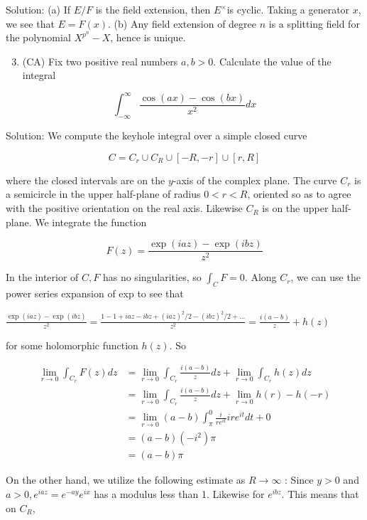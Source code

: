 \documentclass[10pt]{article}
\begin{document}
Solution: (a) If $E / F$ is the field extension, then $E^{\times}$is cyclic. Taking a generator $x$, we see that $E=F(x)$. (b) Any field extension of degree $n$ is a splitting field for the polynomial $X^{p^{n}}-X$, hence is unique.

\begin{enumerate}
  \setcounter{enumi}{2}
  \item (CA) Fix two positive real numbers $a, b>0$. Calculate the value of the integral
\end{enumerate}

$$
\int_{-\infty}^{\infty} \frac{\cos (a x)-\cos (b x)}{x^{2}} d x
$$

Solution: We compute the keyhole integral over a simple closed curve

$$
C=C_{r} \cup C_{R} \cup[-R,-r] \cup[r, R]
$$

where the closed intervals are on the $y$-axis of the complex plane. The curve $C_{r}$ is a semicircle in the upper half-plane of radius $0<r<R$, oriented so as to agree with the positive orientation on the real axis. Likewise $C_{R}$ is on the upper half-plane. We integrate the function

$$
F(z)=\frac{\exp (i a z)-\exp (i b z)}{z^{2}}
$$

In the interior of $C, F$ has no singularities, so $\int_{C} F=0$. Along $C_{r}$, we can use the power series expansion of exp to see that

$\frac{\exp (i a z)-\exp (i b z)}{z^{2}}=\frac{1-1+i a z-i b z+(i a z)^{2} / 2-(i b z)^{2} / 2+\ldots}{z^{2}}=\frac{i(a-b)}{z}+h(z)$

for some holomorphic function $h(z)$. So

$$
\begin{aligned}
\lim _{r \rightarrow 0} \int_{C_{r}} F(z) d z & =\lim _{r \rightarrow 0} \int_{C_{r}} \frac{i(a-b)}{z} d z+\lim _{r \rightarrow 0} \int_{C_{r}} h(z) d z \\
& =\lim _{r \rightarrow 0} \int_{C_{r}} \frac{i(a-b)}{z} d z+\lim _{r \rightarrow 0} h(r)-h(-r) \\
& =\lim _{r \rightarrow 0}(a-b) \int_{\pi}^{0} \frac{i}{r e^{i t}} i r e^{i t} d t+0 \\
& =(a-b)\left(-i^{2}\right) \pi \\
& =(a-b) \pi
\end{aligned}
$$

On the other hand, we utilize the following estimate as $R \rightarrow \infty$ : Since $y>0$ and $a>0, e^{i a z}=e^{-a y} e^{i x}$ has a modulus less than 1. Likewise for $e^{i b z}$. This means that on $C_{R}$,
\end{document}
